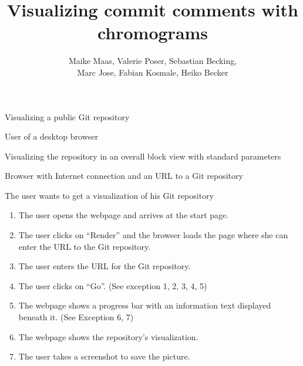 \documentclass[11pt]{scrartcl}
\author{Maike Maas, Valerie Poser, Sebastian Becking,\\
Marc Jose, Fabian Kosmale, Heiko Becker}
\title{Visualizing commit comments with chromograms}
\begin{document}
\maketitle

\begin{description}[leftmargin=!,labelwidth=\widthof{\bfseries Goal in context:}]
	\item[ Use-case: ] Visualizing a public Git repository 
	\item[ Primary actor: ] User of a desktop browser 
	\item[ Goal in context: ] Visualizing the repository in an overall block view with standard parameters 
	\item[ Preconditions: ] Browser with Internet connection and an URL to a Git repository
	\item[ Trigger: ] The user wants to get a visualization of his Git repository 

\item[Scenario:]
\begin{enumerate}
\item The user opens the webpage and arrives at the start page.
\item The user clicks on \enquote{Render} and the browser loads the page where
	she can enter the URL to the Git repository. 
\item The user enters the URL for the Git repository. 
\item The user clicks on \enquote{Go}. (See exception 1, 2, 3, 4, 5)
\item The webpage shows a progress bar with an information text displayed beneath
	it. (See Exception 6, 7)
\item The webpage shows the repository's visualization.
\item The user takes a screenshot to save the picture. 
\end{enumerate}


\end{description}
\end{document}
